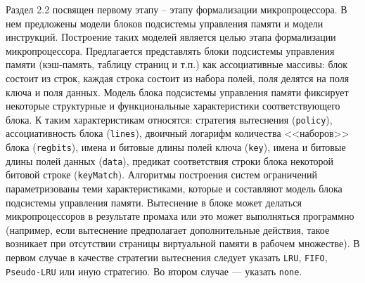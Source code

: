 \documentclass[14pt,autoref,href
,facsimile
]{disser}
\begin{document}
Раздел 2.2 посвящен первому этапу -- этапу формализации микропроцессора. В нем предложены модели блоков подсистемы управления памяти и модели инструкций. Построение таких моделей является целью этапа формализации микропроцессора. Предлагается представлять блоки подсистемы управления памяти (кэш-память, таблицу страниц и т.п.) как ассоциативные массивы: блок состоит из строк, каждая строка состоит из набора полей, поля делятся на поля ключа и поля данных. Модель блока подсистемы управления памяти фиксирует некоторые структурные и функциональные характеристики соответствующего блока. К таким характеристикам относятся: стратегия вытеснения (\texttt{policy}), ассоциативность блока (\texttt{lines}), двоичный логарифм количества <<наборов>> блока (\texttt{regbits}), имена и битовые длины полей ключа (\texttt{key}), имена и битовые длины полей данных (\texttt{data}), предикат соответствия строки блока некоторой битовой строке (\texttt{keyMatch}). Алгоритмы построения систем ограничений параметризованы теми характеристиками, которые и составляют модель блока подсистемы управления памяти. Вытеснение в блоке может делаться микропроцессоров в результате промаха или это может выполняться программно (например, если вытеснение предполагает дополнительные действия, такое возникает при отсутствии страницы виртуальной памяти в рабочем множестве). В первом случае в качестве стратегии вытеснения следует указать \texttt{LRU}, \texttt{FIFO}, \texttt{Pseudo-LRU} или иную стратегию. Во втором случае --- указать \texttt{none}.
\end{document}
